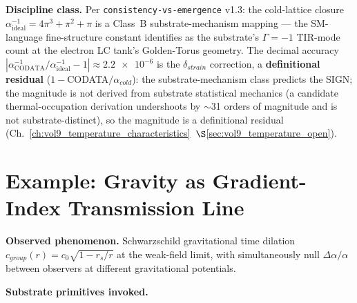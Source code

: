\textbf{Discipline class.} Per \texttt{consistency-vs-emergence} v1.3: the cold-lattice closure $\alpha^{-1}_{\text{ideal}} = 4\pi^3 + \pi^2 + \pi$ is a Class~B substrate-mechanism mapping --- the SM-language fine-structure constant identifies as the substrate's $\Gamma = -1$\gammaundeclared{} TIR-mode count at the electron LC tank's Golden-Torus geometry. The decimal accuracy $|\alpha^{-1}_{\text{CODATA}}/\alpha^{-1}_{\text{ideal}} - 1| \approx \num{2.2e-6}$ is the $\delta_{strain}$ correction, a \textbf{definitional residual} ($1-$CODATA$/\alpha_{cold}$): the substrate-mechanism class predicts the SIGN; the magnitude is not derived from substrate statistical mechanics (a candidate thermal-occupation derivation undershoots by $\sim$31 orders of magnitude and is not substrate-distinct), so the magnitude is a definitional residual (Ch.~\ref{ch:vol9_temperature_characteristics}~$\S$\ref{sec:vol9_temperature_open}).

\section{Example: Gravity as Gradient-Index Transmission Line}
\label{sec:vol9_app_gravity_gradient_index}

\textbf{Observed phenomenon.} Schwarzschild gravitational time dilation $c_{group}(r) = c_0 \sqrt{1 - r_s/r}$ at the weak-field limit, with simultaneously null $\Delta\alpha/\alpha$ between observers at different gravitational potentials.

\textbf{Substrate primitives invoked.}

